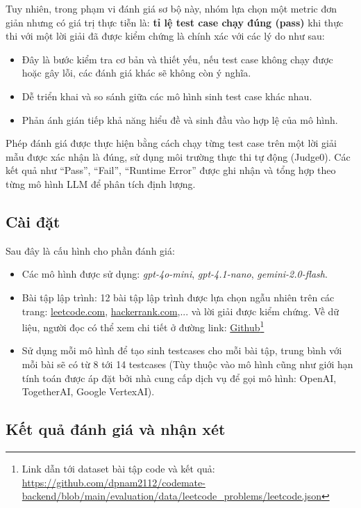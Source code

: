 Tuy nhiên, trong phạm vi đánh giá sơ bộ này, nhóm lựa chọn một metric đơn giản nhưng có giá trị thực tiễn là: \textbf{tỉ lệ test case chạy đúng (pass)} khi thực thi với một lời giải đã được kiểm chứng là chính xác với các lý do như sau:
\begin{itemize}
    \item Đây là bước kiểm tra cơ bản và thiết yếu, nếu test case không chạy được hoặc gây lỗi, các đánh giá khác sẽ không còn ý nghĩa.
    \item Dễ triển khai và so sánh giữa các mô hình sinh test case khác nhau.
    \item Phản ánh gián tiếp khả năng hiểu đề và sinh đầu vào hợp lệ của mô hình.
\end{itemize}

Phép đánh giá được thực hiện bằng cách chạy từng test case trên một lời giải mẫu được xác nhận là đúng, sử dụng môi trường thực thi tự động (Judge0). Các kết quả như “Pass”, “Fail”, “Runtime Error” được ghi nhận và tổng hợp theo từng mô hình LLM để phân tích định lượng.

\subsection{Cài đặt}
Sau đây là cấu hình cho phần đánh giá:
\begin{itemize}
    \item Các mô hình được sử dụng: \emph{gpt-4o-mini}, \emph{gpt-4.1-nano}, \emph{gemini-2.0-flash}.
    \item Bài tập lập trình: 12 bài tập lập trình được lựa chọn ngẫu nhiên trên các trang: \url{leetcode.com}, \url{hackerrank.com},... và lời giải được kiểm chứng. Về dữ liệu, người đọc có thể xem chi tiết ở đường link: \href{https://github.com/dpnam2112/codemate-backend/blob/main/evaluation/data/leetcode_problems/leetcode.json}{Github}\footnote{Link dẫn tới dataset bài tập code và kết quả: \url{https://github.com/dpnam2112/codemate-backend/blob/main/evaluation/data/leetcode_problems/leetcode.json}}
    \item Sử dụng mỗi mô hình để tạo sinh testcases cho mỗi bài tập, trung bình với mỗi bài sẽ có từ 8 tới 14 testcases (Tùy thuộc vào mô hình cũng như giới hạn tính toán được áp đặt bởi nhà cung cấp dịch vụ để gọi mô hình: OpenAI, TogetherAI, Google VertexAI).

\end{itemize}

\subsection{Kết quả đánh giá và nhận xét}

